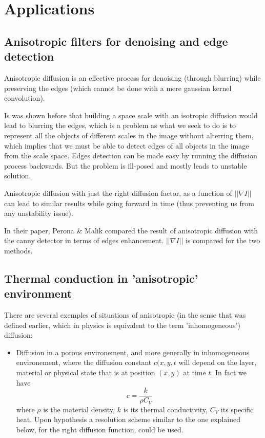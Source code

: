 \documentclass[12pt,a4paper]{article}
\begin{document}
\section{Applications}

\subsection{Anisotropic filters for denoising and edge detection}

Anisotropic diffusion is an effective process for denoising (through blurring) while preserving the edges (which cannot be done with a mere gaussian kernel convolution). 

Is was shown before that building a space scale with an isotropic diffusion would lead to blurring the edges, which is a problem as what we seek to do is to represent all the objects of different scales in the image without alterring them, which implies that we must be able to detect edges of all objects in the image from the scale space.
Edges detection can be made easy by running the diffusion process backwards. But the problem is ill-posed and mostly leads to unstable solution.

Anisotropic diffusion with just the right diffusion factor, as a function of $|| \nabla I||$ can lead to similar results while going forward in time (thus preventing us from any unstability issue).

In their paper, Perona \& Malik compared the result of anisotropic diffusion with the canny detector in terms of edges enhancement. $|| \nabla I ||$ is compared for the two methods.

\subsection{Thermal conduction in 'anisotropic' environment}

There are several exemples of situations of anisotropic (in the sense that was defined earlier, which in physics is equivalent to the term 'inhomogeneous') diffusion:
\begin{itemize}
	\item Diffusion in a porous environement, and more generally in inhomogeneous environement, where the diffusion constant $c(x,y,t$ will depend on the layer, material or physical state that is at position $(x,y)$ at time $t$. In fact we have
	\begin{equation}
	c = \frac{k}{\rho C_{V}}
	\end{equation}
	where $\rho$ is the material density, $k$ is its thermal conductivity, $C_{V}$ its specific heat.
	Upon hypothesis a resolution scheme similar to the one explained below, for the right diffusion function, could be used.
\end{itemize}
\end{document}
